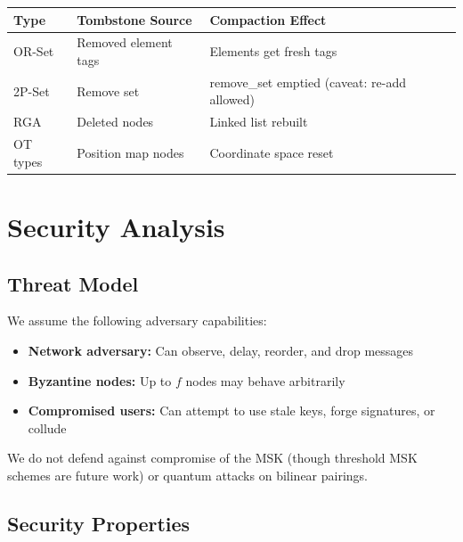 \documentclass[11pt,a4paper]{article}
\begin{document}
\vspace{4pt}
\begin{tabularx}{\textwidth}{l>{\hsize=0.9\hsize}X>{\hsize=1.1\hsize}X}
\toprule
\textbf{Type} & \textbf{Tombstone Source} & \textbf{Compaction Effect} \\
\midrule
OR-Set & Removed element tags & Elements get fresh tags \\
2P-Set & Remove set & remove\_set emptied (caveat: re-add allowed) \\
RGA & Deleted nodes & Linked list rebuilt \\
OT types & Position map nodes & Coordinate space reset \\
\bottomrule
\end{tabularx}

\section{Security Analysis}

\subsection{Threat Model}

We assume the following adversary capabilities:

\begin{itemize}[leftmargin=*]
    \item \textbf{Network adversary:} Can observe, delay, reorder, and drop messages
    \item \textbf{Byzantine nodes:} Up to $f$ nodes may behave arbitrarily
    \item \textbf{Compromised users:} Can attempt to use stale keys, forge signatures, or collude
\end{itemize}

We do not defend against compromise of the MSK (though threshold MSK schemes are future work) or quantum attacks on bilinear pairings.

\subsection{Security Properties}
\end{document}

